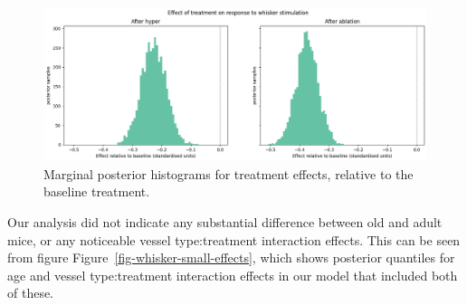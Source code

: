 \documentclass[
  letterpaper,
  DIV=11,
  numbers=noendperiod,
  oneside]{scrartcl}
\theoremstyle{plain}
\theoremstyle{remark}
\begin{document}
\begin{figure}

\begin{minipage}{\linewidth}

\includegraphics{../plots/whisker-treatment-effects.png}

\end{minipage}%

\caption{\label{fig-whisker-treatment-effects}Marginal posterior
histograms for treatment effects, relative to the baseline treatment.}

\end{figure}%

Our analysis did not indicate any substantial difference between old and
adult mice, or any noticeable vessel type:treatment interaction effects.
This can be seen from figure Figure~\ref{fig-whisker-small-effects},
which shows posterior quantiles for age and vessel type:treatment
interaction effects in our model that included both of these.
\end{document}

